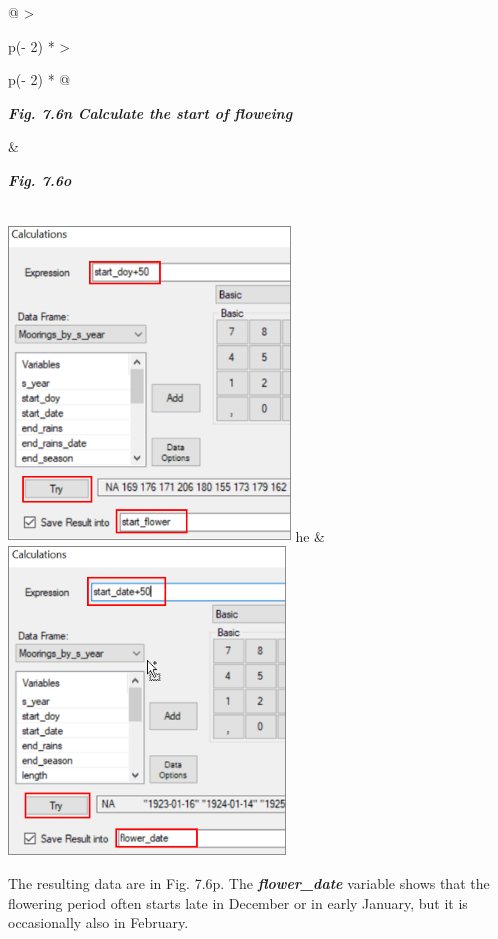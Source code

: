\documentclass[
  letterpaper,
  DIV=11,
  numbers=noendperiod]{scrreprt}
\begin{document}
\begin{longtable}[]{@{}
  >{\raggedright\arraybackslash}p{(\columnwidth - 2\tabcolsep) * }
  >{\raggedright\arraybackslash}p{(\columnwidth - 2\tabcolsep) * }@{}}
\toprule\noalign{}
\begin{minipage}[b]{\linewidth}\raggedright
\textbf{\emph{Fig. 7.6n Calculate the start of floweing}}
\end{minipage} & \begin{minipage}[b]{\linewidth}\raggedright
\textbf{\emph{Fig. 7.6o}}
\end{minipage} \\
\midrule\noalign{}
\endhead
\bottomrule\noalign{}
\endlastfoot
\includegraphics[width=2.9459in,height=3.30876in]{figures/Fig7.6n.png}
he &
\includegraphics[width=2.89862in,height=\textheight]{figures/Fig7.6o.png} \\
\end{longtable}

The resulting data are in Fig. 7.6p. The \textbf{\emph{flower\_date}}
variable shows that the flowering period often starts late in December
or in early January, but it is occasionally also in February.
\end{document}
